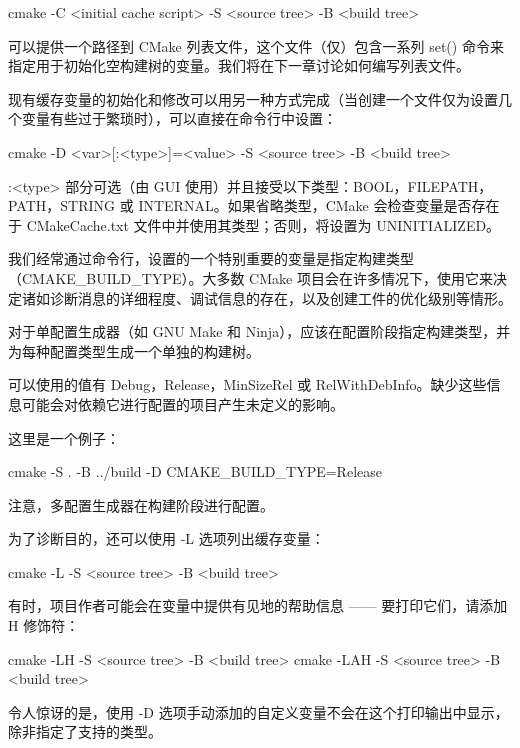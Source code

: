 \begin{shell}
cmake -C <initial cache script> -S <source tree> -B <build tree>
\end{shell}

可以提供一个路径到 CMake 列表文件，这个文件（仅）包含一系列 set() 命令来指定用于初始化空构建树的变量。我们将在下一章讨论如何编写列表文件。

现有缓存变量的初始化和修改可以用另一种方式完成（当创建一个文件仅为设置几个变量有些过于繁琐时），可以直接在命令行中设置：

\begin{shell}
cmake -D <var>[:<type>]=<value> -S <source tree> -B <build tree>
\end{shell}

:<type> 部分可选（由 GUI 使用）并且接受以下类型：BOOL，FILEPATH，PATH，STRING 或 INTERNAL。如果省略类型，CMake 会检查变量是否存在于 CMakeCache.txt 文件中并使用其类型；否则，将设置为 UNINITIALIZED。

我们经常通过命令行，设置的一个特别重要的变量是指定构建类型（CMAKE\_BUILD\_TYPE）。大多数 CMake 项目会在许多情况下，使用它来决定诸如诊断消息的详细程度、调试信息的存在，以及创建工件的优化级别等情形。

对于单配置生成器（如 GNU Make 和 Ninja），应该在配置阶段指定构建类型，并为每种配置类型生成一个单独的构建树。

可以使用的值有 Debug，Release，MinSizeRel 或 RelWithDebInfo。缺少这些信息可能会对依赖它进行配置的项目产生未定义的影响。

这里是一个例子：

\begin{shell}
cmake -S . -B ../build -D CMAKE_BUILD_TYPE=Release
\end{shell}

注意，多配置生成器在构建阶段进行配置。

为了诊断目的，还可以使用 -L 选项列出缓存变量：

\begin{shell}
cmake -L -S <source tree> -B <build tree>
\end{shell}

有时，项目作者可能会在变量中提供有见地的帮助信息 —— 要打印它们，请添加 H 修饰符：

\begin{shell}
cmake -LH -S <source tree> -B <build tree>
cmake -LAH -S <source tree> -B <build tree>
\end{shell}

令人惊讶的是，使用 -D 选项手动添加的自定义变量不会在这个打印输出中显示，除非指定了支持的类型。

